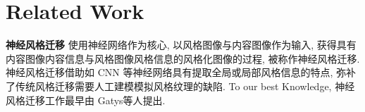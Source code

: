 \section{Related Work}

\textbf{神经风格迁移} 使用神经网络作为核心, 以风格图像与内容图像作为输入, 获得具有内容图像内容信息与风格图像风格信息的风格化图像的过程, 被称作神经风格迁移. 神经风格迁移借助如 CNN\cite{tammina2019transfer} 等神经网络具有提取全局或局部风格信息的特点, 弥补了传统风格迁移需要人工建模模拟风格纹理的缺陷. To our best Knowledge, 神经风格迁移工作最早由 Gatys等人\cite{gatys2016image}提出. 